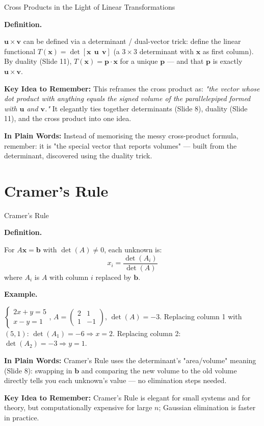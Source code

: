 \documentclass[9pt,aspectratio=169]{beamer}
\newcommand{\keyidea}[1]{%
\par\medskip\noindent\textbf{Key Idea to Remember:} #1\par\medskip}
\newcommand{\childex}[1]{%
\par\medskip\noindent\textbf{In Plain Words:} #1\par\medskip}
\begin{document}
\begin{frame}{Cross Products in the Light of Linear Transformations}
\par\noindent\textbf{Definition.}\par
$\mathbf{u}\times\mathbf{v}$ can be defined via a determinant / dual-vector trick:
define the linear functional $T(\mathbf{x}) = \det[\mathbf{x}\ \ \mathbf{u}\ \
\mathbf{v}]$ (a $3\times3$ determinant with $\mathbf{x}$ as first column). By duality
(Slide 11), $T(\mathbf{x}) = \mathbf{p}\cdot\mathbf{x}$ for a unique $\mathbf{p}$ --- and
that $\mathbf{p}$ is exactly $\mathbf{u}\times\mathbf{v}$.
\medskip


\keyidea{This reframes the cross product as: \emph{"the vector whose dot product with
anything equals the signed volume of the parallelepiped formed with $\mathbf{u}$ and
$\mathbf{v}$."} It elegantly ties together determinants (Slide 8), duality (Slide 11), and
the cross product into one idea.}

\childex{Instead of memorising the messy cross-product formula, remember: it is "the
special vector that reports volumes" --- built from the determinant, discovered using the
duality trick.}
\end{frame}

\section{Cramer's Rule}

\begin{frame}{Cramer's Rule}
\small
\par\noindent\textbf{Definition.}\par
For $A\mathbf{x}=\mathbf{b}$ with $\det(A)\neq 0$, each unknown is:
\[ x_i = \frac{\det(A_i)}{\det(A)} \]
where $A_i$ is $A$ with column $i$ replaced by $\mathbf{b}$.
\medskip


\par\noindent\textbf{Example.}\par
$\begin{cases}2x+y=5\\x-y=1\end{cases}$, $A=\begin{pmatrix}2&1\\1&-1\end{pmatrix}$,
$\det(A)=-3$. Replacing column 1 with $(5,1)$: $\det(A_1) = -6 \Rightarrow x = 2$.
Replacing column 2: $\det(A_2) = -3 \Rightarrow y = 1$.
\medskip


\childex{Cramer's Rule uses the determinant's "area/volume" meaning (Slide 8): swapping in
$\mathbf{b}$ and comparing the new volume to the old volume directly tells you each
unknown's value --- no elimination steps needed.}

\keyidea{Cramer's Rule is elegant for small systems and for theory, but computationally
expensive for large $n$; Gaussian elimination is faster in practice.}
\end{frame}
\end{document}

